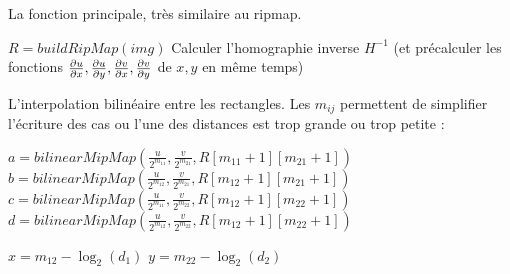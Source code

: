 La fonction principale, très similaire au ripmap.
\medbreak
\medbreak
\begin{algorithm}[H]
\caption{$mainFunction(img,H,I)$}
$R = buildRipMap(img)$\;
Calculer l'homographie inverse $H^{-1}$ (et précalculer les fonctions $\frac{\partial u}{\partial x},\frac{\partial u}{\partial y},\frac{\partial v}{\partial x},\frac{\partial v}{\partial y}$ de $x,y$ en même temps)\;
\end{algorithm}

\medbreak
\medbreak

L'interpolation bilinéaire entre les rectangles.
Les $m_{ij}$ permettent de simplifier l'écriture des cas ou l'une des distances est trop grande ou trop petite :

\medbreak
\medbreak

\begin{algorithm}[H]
\caption{$evalPixel((u,v),d_1,d_2,M)$}

$a=bilinearMipMap(\frac{u}{2^{m_{11}}},\frac{v}{2^{m_{21}}},R[m_{11}+1][m_{21}+1])$\;
$b=bilinearMipMap(\frac{u}{2^{m_{12}}},\frac{v}{2^{m_{21}}},R[m_{12}+1][m_{21}+1])$\;$c=bilinearMipMap(\frac{u}{2^{m_{11}}},\frac{v}{2^{m_{22}}},R[m_{12}+1][m_{22}+1])$\;
$d=bilinearMipMap(\frac{u}{2^{m_{12}}},\frac{v}{2^{m_{22}}},R[m_{12}+1][m_{22}+1])$\;

$x = m_{12} - \log_2(d_1)$\;
$y = m_{22} - \log_2(d_2)$\;

\end{algorithm}


